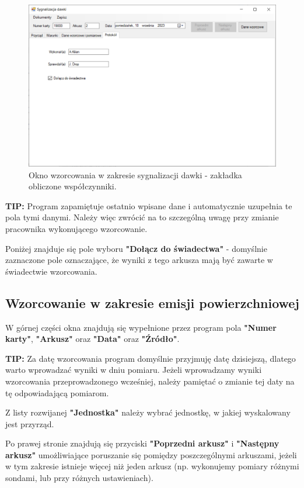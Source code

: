 	\begin{figure}[htb]
		\centering
		\includegraphics[width=\columnwidth]{obrazki/Wzorcowanie/syg_dawki/wspolczynniki.png}
		\caption{Okno wzorcowania w zakresie sygnalizacji dawki - zakładka obliczone współczynniki.}
		\label{sygDawkiWspolczynniki}
	\end{figure}
	
	\textbf{TIP:} Program zapamiętuje ostatnio wpisane dane i automatycznie uzupełnia te pola tymi danymi. Należy więc zwrócić na to szczególną uwagę przy zmianie pracownika wykonującego wzorcowanie.
	
	Poniżej znajduje się pole wyboru \textbf{"Dołącz do świadectwa"} - domyślnie zaznaczone pole oznaczające, że wyniki z tego arkusza mają być zawarte w świadectwie wzorcowania.

\subsection{Wzorcowanie w zakresie emisji powierzchniowej}
\label{wzorcowanie_emisja}

	W górnej części okna znajdują się wypełnione przez program pola \textbf{"Numer karty"}, \textbf{"Arkusz"} oraz \textbf{"Data"} oraz \textbf{"Źródło"}. 
	
	\textbf{TIP:} Za datę wzorcowania program domyślnie przyjmuję datę dzisiejszą, dlatego warto wprowadzać wyniki w dniu pomiaru. Jeżeli wprowadzamy wyniki wzorcowania przeprowadzonego wcześniej, należy pamiętać o zmianie tej daty na tę odpowiadającą pomiarom.
	
	Z listy rozwijanej \textbf{"Jednostka"} należy wybrać jednostkę, w jakiej wyskalowany jest przyrząd.
	
	Po prawej stronie znajdują się przyciski \textbf{"Poprzedni arkusz"} i \textbf{"Następny arkusz"} umożliwiające poruszanie się pomiędzy poszczególnymi arkuszami, jeżeli w tym zakresie istnieje więcej niż jeden arkusz (np. wykonujemy pomiary różnymi sondami, lub przy różnych ustawieniach).
	
